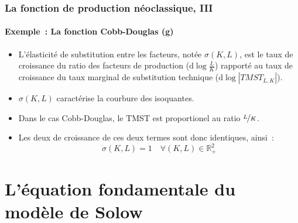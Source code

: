\documentclass[10pt,notheorems]{beamer}
\theoremstyle{plain}
\theoremstyle{definition} %
\begin{document}
\begin{frame}
  \frametitle{La fonction de production néoclassique, III}
  \framesubtitle{Exemple~: La fonction Cobb-Douglas (g)}

  \medskip

  \begin{itemize}

  \item L'élasticité de substitution entre les facteurs, notée $\sigma(K,L)$, est le taux de croissance du ratio des facteurs de production ($\mathrm d \log \frac{L}{K}$) rapporté au taux de croissance du taux marginal de substitution technique ($\mathrm d \log |TMST_{L,K}|$).\newline

  \item $\sigma(K,L)$ caractérise la courbure des isoquantes.\newline

  \item Dans le cas Cobb-Douglas, le TMST est proportionel au ratio $\nicefrac{L}{K}$.\newline

  \item Les deux de croissance de ces deux termes sont donc identiques, ainsi~:
    \[
      \sigma(K,L) = 1\quad \forall (K,L) \in \mathbb R_+^2
    \]
  \end{itemize}
\end{frame}




\section{L'équation fondamentale du modèle de Solow}
\end{document}
